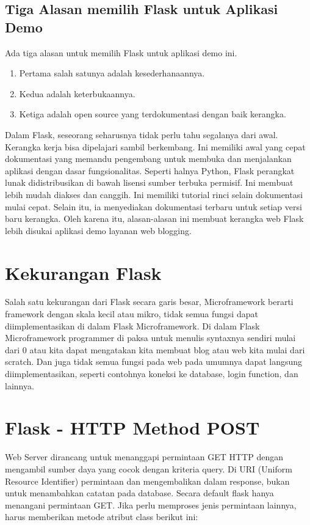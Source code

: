\subsection{Tiga Alasan memilih Flask untuk Aplikasi Demo}
Ada tiga alasan untuk memilih Flask untuk aplikasi demo ini.
\begin{enumerate}
\item Pertama salah satunya adalah kesederhanaannya.
\item Kedua adalah keterbukaannya.
\item Ketiga adalah open source yang terdokumentasi dengan baik kerangka.
\end{enumerate}
Dalam Flask, seseorang seharusnya tidak perlu tahu segalanya dari awal. Kerangka kerja bisa dipelajari sambil berkembang. Ini memiliki awal yang cepat dokumentasi yang memandu pengembang untuk membuka dan menjalankan aplikasi dengan dasar fungsionalitas. Seperti halnya Python, Flask perangkat lunak didistribusikan di bawah lisensi sumber terbuka permisif. Ini membuat lebih mudah diakses dan canggih.  Ini memiliki tutorial rinci selain dokumentasi mulai cepat. Selain itu, ia menyediakan dokumentasi terbaru untuk setiap versi baru kerangka. Oleh karena itu, alasan-alasan ini membuat kerangka web Flask lebih disukai aplikasi demo layanan web blogging\cite{alemu2014rest}.

\section{Kekurangan Flask}
Salah satu kekurangan dari Flask secara garis besar, Microframework berarti framework dengan skala kecil atau mikro, tidak semua fungsi dapat diimplementasikan di dalam Flask Microframework.  Di dalam Flask Microframework programmer di paksa untuk menulis syntaxnya sendiri mulai dari 0 atau kita dapat mengatakan kita membuat blog atau web kita mulai dari scratch. Dan juga tidak semua fungsi pada web pada umumnya dapat langsung diimplementasikan, seperti contohnya koneksi ke database, login function, dan lainnya\cite{ronacher2010flask}.

\section{Flask - HTTP Method POST}
Web Server dirancang untuk menanggapi permintaan GET HTTP dengan mengambil sumber daya yang cocok dengan kriteria query. Di URI (Uniform Resource Identifier) permintaan dan mengembalikan dalam response, bukan untuk menambahkan catatan pada database\cite{rodriguez2008restful}. Secara default flask hanya menangani permintaan GET. Jika perlu memproses jenis permintaan lainnya, harus memberikan metode atribut class berikut ini:

